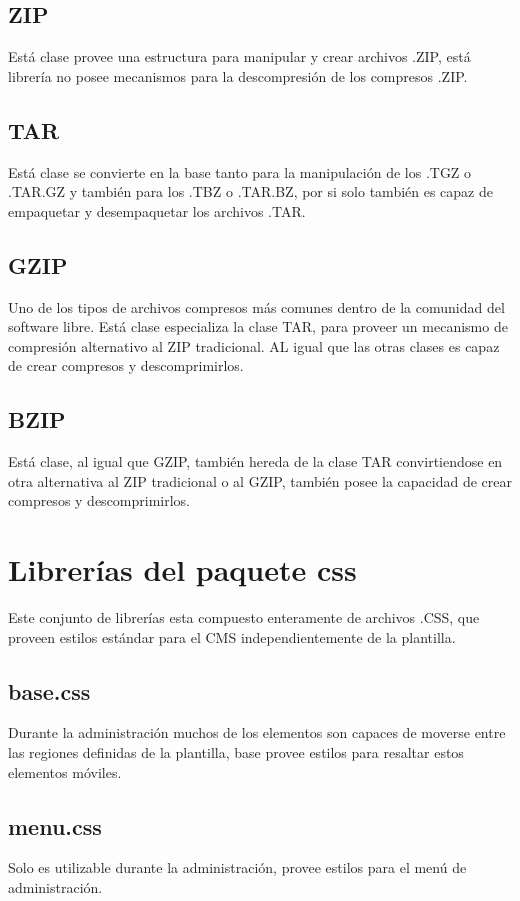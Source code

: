 \subsection{ZIP}
Est\'a clase provee una estructura para manipular y crear archivos .ZIP, est\'a librer\'ia no posee mecanismos para la descompresi\'on de los compresos .ZIP.
\subsection{TAR}
Est\'a clase se convierte en la base tanto para la manipulaci\'on de los .TGZ o .TAR.GZ y tambi\'en para los .TBZ o .TAR.BZ, por si solo tambi\'en es capaz de empaquetar y desempaquetar los archivos .TAR.
\subsection{GZIP}
Uno de los tipos de archivos compresos m\'as comunes dentro de la comunidad del software libre. Est\'a clase especializa la clase TAR, para proveer un mecanismo de compresi\'on alternativo al ZIP tradicional. AL igual que las otras clases es capaz de crear compresos y descomprimirlos.
\subsection{BZIP}
Est\'a clase, al igual que GZIP, tambi\'en hereda de la clase TAR convirtiendose en otra alternativa al ZIP tradicional o al GZIP, tambi\'en posee la capacidad de crear compresos y descomprimirlos.

\section{Librer\'ias del paquete \textsf{css}}
Este conjunto de librer\'ias esta compuesto enteramente de archivos .CSS, que proveen estilos est\'andar para el CMS independientemente de la plantilla.
\subsection{base.css}
Durante la administraci\'on muchos de los elementos son capaces de moverse entre las regiones definidas de la plantilla, \textsf{base} provee estilos para resaltar estos elementos m\'oviles.
\subsection{menu.css}
Solo es utilizable durante la administraci\'on, provee estilos para el men\'u de administraci\'on.

